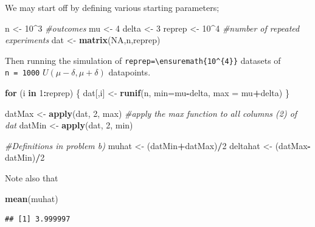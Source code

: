\documentclass[
]{article}
\newenvironment{Shaded}{\begin{snugshade}}{\end{snugshade}}
\newcommand{\CommentTok}[1]{\textcolor[rgb]{0.56,0.35,0.01}{\textit{#1}}}
\newcommand{\ControlFlowTok}[1]{\textcolor[rgb]{0.13,0.29,0.53}{\textbf{#1}}}
\newcommand{\DataTypeTok}[1]{\textcolor[rgb]{0.13,0.29,0.53}{#1}}
\newcommand{\DecValTok}[1]{\textcolor[rgb]{0.00,0.00,0.81}{#1}}
\newcommand{\KeywordTok}[1]{\textcolor[rgb]{0.13,0.29,0.53}{\textbf{#1}}}
\newcommand{\NormalTok}[1]{#1}
\newcommand{\OperatorTok}[1]{\textcolor[rgb]{0.81,0.36,0.00}{\textbf{#1}}}
\newcommand{\OtherTok}[1]{\textcolor[rgb]{0.56,0.35,0.01}{#1}}
\newcommand{\StringTok}[1]{\textcolor[rgb]{0.31,0.60,0.02}{#1}}
\begin{document}
We may start off by defining various starting parameters;

\begin{Shaded}
\begin{Highlighting}[]
\NormalTok{n <-}\StringTok{ }\DecValTok{10}\OperatorTok{^}\DecValTok{3} \CommentTok{#outcomes}
\NormalTok{mu <-}\StringTok{ }\DecValTok{4}
\NormalTok{delta <-}\StringTok{ }\DecValTok{3}
\NormalTok{reprep <-}\StringTok{ }\DecValTok{10}\OperatorTok{^}\DecValTok{4} \CommentTok{#number of repeated experiments}
\NormalTok{dat <-}\StringTok{ }\KeywordTok{matrix}\NormalTok{(}\OtherTok{NA}\NormalTok{,n,reprep)}
\end{Highlighting}
\end{Shaded}

Then running the simulation of
\texttt{reprep=\textbackslash{}ensuremath\{10\^{}\{4\}\}} datasets of
\texttt{n\ =\ 1000} \(U(\mu-\delta,\mu+\delta)\) datapoints.

\begin{Shaded}
\begin{Highlighting}[]
\ControlFlowTok{for}\NormalTok{ (i }\ControlFlowTok{in} \DecValTok{1}\OperatorTok{:}\NormalTok{reprep) \{}
\NormalTok{  dat[,i] <-}\StringTok{ }\KeywordTok{runif}\NormalTok{(n, }\DataTypeTok{min=}\NormalTok{mu}\OperatorTok{-}\NormalTok{delta, }\DataTypeTok{max =}\NormalTok{ mu}\OperatorTok{+}\NormalTok{delta) }
\NormalTok{\}}

\NormalTok{datMax <-}\StringTok{ }\KeywordTok{apply}\NormalTok{(dat, }\DecValTok{2}\NormalTok{, max) }\CommentTok{#apply the max function to all columns (2) of dat}
\NormalTok{datMin <-}\StringTok{ }\KeywordTok{apply}\NormalTok{(dat, }\DecValTok{2}\NormalTok{, min)}

\CommentTok{#Definitions in problem b)}
\NormalTok{muhat <-}\StringTok{ }\NormalTok{(datMin}\OperatorTok{+}\NormalTok{datMax)}\OperatorTok{/}\DecValTok{2} 
\NormalTok{deltahat <-}\StringTok{ }\NormalTok{(datMax}\OperatorTok{-}\NormalTok{datMin)}\OperatorTok{/}\DecValTok{2}
\end{Highlighting}
\end{Shaded}

Note also that

\begin{Shaded}
\begin{Highlighting}[]
\KeywordTok{mean}\NormalTok{(muhat)}
\end{Highlighting}
\end{Shaded}

\begin{verbatim}
## [1] 3.999997
\end{verbatim}
\end{document}
